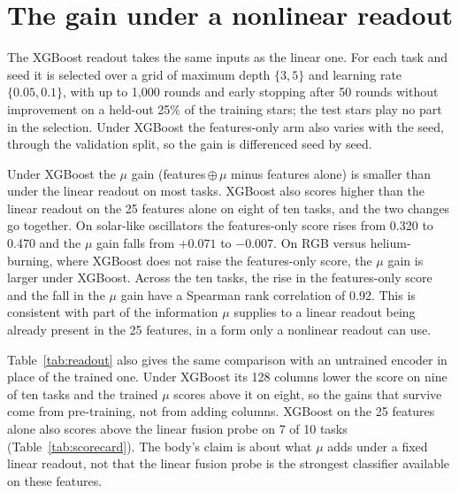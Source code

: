 \documentclass{article}
\begin{document}
\section{The gain under a nonlinear readout}
\label{app:readout}

\begin{table}[H]
\caption{What 128 added columns change, relative to the 25 features alone, under each frozen readout
(mean over six encoder seeds; absolute scores are in Table~\ref{tab:scorecard}). $+\mu$: our encoder.
No prediction term: the same recipe trained without the GRU prediction term. Untrained: a randomly
initialised encoder, which is a single encoder and carries no band. Bold: beyond $2\,\mathrm{SE}$. The
last row counts tasks won, tied and lost at that bar.}
\label{tab:readout}
\centering
\scriptsize

\end{table}

The XGBoost readout takes the same inputs as the linear one. For each task and seed it is selected
over a grid of maximum depth $\{3,5\}$ and learning rate $\{0.05,0.1\}$, with up to 1{,}000 rounds
and early stopping after 50 rounds without improvement on a held-out 25\% of the training stars;
the test stars play no part in the selection. Under XGBoost the features-only arm also varies with
the seed, through the validation split, so the gain is differenced seed by seed.

Under XGBoost the $\mu$ gain (features\,$\oplus\,\mu$ minus features alone) is smaller than under the
linear readout on most tasks. XGBoost also scores higher than the linear readout on the 25 features
alone on eight of ten tasks, and the two changes go together. On solar-like oscillators the features-only score rises from
0.320 to 0.470 and the $\mu$ gain falls from $+0.071$ to $-0.007$. On RGB versus helium-burning,
where XGBoost does not raise the features-only score, the $\mu$ gain is larger under XGBoost. Across
the ten tasks, the rise in the features-only score and the fall in the $\mu$ gain have a Spearman rank
correlation of 0.92. This is consistent with part of the information $\mu$ supplies to a linear
readout being already present in the 25 features, in a form only a nonlinear readout can use.

Table~\ref{tab:readout} also gives the same comparison with an untrained encoder in place of the
trained one. Under XGBoost its 128 columns lower the score on nine of ten tasks and the trained $\mu$
scores above it on eight, so the gains that survive come from pre-training, not from adding columns.
XGBoost on the 25 features alone also scores above the linear fusion probe on 7 of 10 tasks
(Table~\ref{tab:scorecard}). The body's claim is about what $\mu$ adds under a fixed linear readout,
not that the linear fusion probe is the strongest classifier available on these features.
\end{document}
